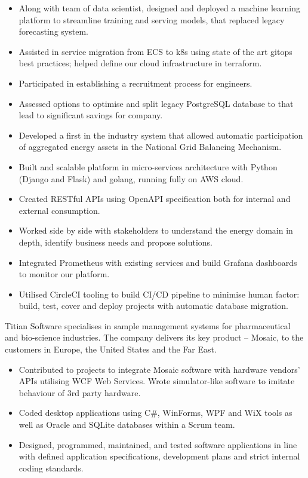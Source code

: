 \documentclass[12pt,english]{resume}
\begin{document}
		\begin{itemize}
			\item Along with team of data scientist, designed and deployed a machine learning platform to streamline training and serving models, that replaced legacy forecasting system.
			\item Assisted in service migration from ECS to k8s using state of the art gitops best practices; helped define our cloud infrastructure in terraform.
			\item Participated in establishing a recruitment process for engineers.
			\item Assessed options to optimise and split legacy PostgreSQL database to that lead to significant savings for company.
		\end{itemize}

		
		\begin{itemize}
			\item Developed a first in the industry system that allowed automatic participation of aggregated energy assets in the National Grid Balancing Mechanism.
			\item Built and scalable platform in micro-services architecture with Python (Django and Flask) and golang, running fully on AWS cloud.
			\item Created RESTful APIs using OpenAPI specification both for internal and external consumption.
			\item Worked side by side with stakeholders to understand the energy domain in depth, identify business needs and propose solutions.
			\item Integrated Prometheus with existing services and build Grafana dashboards to monitor our platform.
			\item Utilised CircleCI tooling to build CI/CD pipeline to minimise human factor: build, test, cover and deploy projects with automatic database migration.
		\end{itemize}
				
		Titian Software specialises in sample management systems for pharmaceutical and bio-science industries. The company delivers its key product – Mosaic, to the customers in Europe, the United States and the Far East.
		\begin{itemize}
			\item Contributed to projects to integrate Mosaic software with hardware vendors’ APIs utilising WCF Web Services. Wrote simulator-like software to imitate behaviour of 3rd party hardware.
			\item Coded desktop applications using C\#, WinForms, WPF and WiX tools as well as Oracle and SQLite databases within a Scrum team.
			\item Designed, programmed, maintained, and tested software applications in line with defined application specifications, development plans and strict internal coding standards.
		\end{itemize}
		
\end{document}
